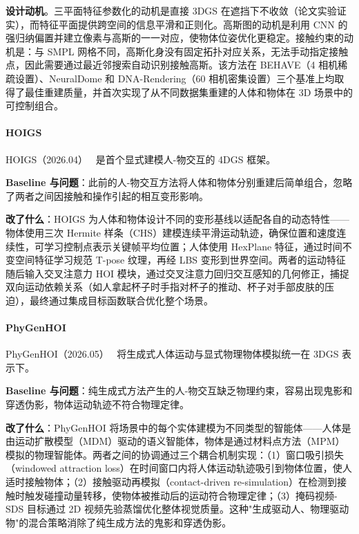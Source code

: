 \textbf{设计动机}。三平面特征参数化的动机是直接 3DGS 在遮挡下不收敛（论文实验证实），而特征平面提供跨空间的信息平滑和正则化。高斯图的动机是利用 CNN 的强归纳偏置并建立像素与高斯的一一对应，使物体位姿优化更稳定。接触约束的动机是：与 SMPL 网格不同，高斯化身没有固定拓扑对应关系，无法手动指定接触点，因此需要通过最近邻搜索自动识别接触高斯。该方法在 BEHAVE（4 相机稀疏设置）、NeuralDome 和 DNA-Rendering（60 相机密集设置）三个基准上均取得了最佳重建质量，并首次实现了从不同数据集重建的人体和物体在 3D 场景中的可控制组合。

\paragraph{HOIGS}

HOIGS（2026.04）~\cite{2604_04016} 是首个显式建模人-物交互的 4DGS 框架。

\textbf{Baseline 与问题}：此前的人-物交互方法将人体和物体分别重建后简单组合，忽略了两者之间因接触和操作引起的相互变形影响。

\textbf{改了什么}：HOIGS 为人体和物体设计不同的变形基线以适配各自的动态特性——物体使用三次 Hermite 样条（CHS）建模连续平滑运动轨迹，确保位置和速度连续性，可学习控制点表示关键帧平均位置；人体使用 HexPlane 特征，通过时间不变空间特征学习规范 T-pose 纹理，再经 LBS 变形到世界空间。两者的运动特征随后输入交叉注意力 HOI 模块，通过交叉注意力回归交互感知的几何修正，捕捉双向运动依赖关系（如人拿起杯子时手指对杯子的推动、杯子对手部皮肤的压迫），最终通过集成目标函数联合优化整个场景。

\paragraph{PhyGenHOI}

PhyGenHOI（2026.05）~\cite{2605_30268} 将生成式人体运动与显式物理物体模拟统一在 3DGS 表示下。

\textbf{Baseline 与问题}：纯生成式方法产生的人-物交互缺乏物理约束，容易出现鬼影和穿透伪影，物体运动轨迹不符合物理定律。

\textbf{改了什么}：PhyGenHOI 将场景中的每个实体建模为不同类型的智能体——人体是由运动扩散模型（MDM）驱动的语义智能体，物体是通过材料点方法（MPM）模拟的物理智能体。两者之间的协调通过三个耦合机制实现：（1）窗口吸引损失（windowed attraction loss）在时间窗口内将人体运动轨迹吸引到物体位置，使人适时接触物体；（2）接触驱动再模拟（contact-driven re-simulation）在检测到接触时触发碰撞动量转移，使物体被推动后的运动符合物理定律；（3）掩码视频-SDS 目标通过 2D 视频先验蒸馏优化整体视觉质量。这种"生成驱动人、物理驱动物"的混合策略消除了纯生成方法的鬼影和穿透伪影。

